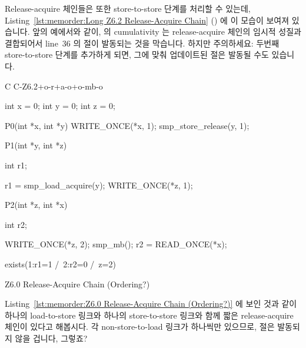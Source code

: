 Release-acquire 체인들은 또한 store-to-store 단계를 처리할 수 있는데,
Listing~\ref{lst:memorder:Long Z6.2 Release-Acquire Chain}
()
에 이 모습이 보여져 있습니다.
앞의 예에서와 같이,  의 cumulativity 는 release-acquire
체인의 임시적 성질과 결합되어서 line~36 의  절이 발동되는 것을
막습니다.
하지만 주의하세요: 두번째 store-to-store 단계를 추가하게 되면, 그에 맞춰
업데이트된  절은 발동될 수도 있습니다.

\begin{listing}[tbp]
{ \scriptsize
\begin{verbbox}[\LstLineNo]
C C-Z6.2+o-r+a-o+o-mb-o

{
int x = 0;
int y = 0;
int z = 0;
}

P0(int *x, int *y)
{
  WRITE_ONCE(*x, 1);
  smp_store_release(y, 1);
}

P1(int *y, int *z)
{
  int r1;

  r1 = smp_load_acquire(y);
  WRITE_ONCE(*z, 1);
}

P2(int *z, int *x)
{
  int r2;

  WRITE_ONCE(*z, 2);
  smp_mb();
  r2 = READ_ONCE(*x);
}

exists(1:r1=1 /\ 2:r2=0 /\ z=2)
\end{verbbox}
}
\centering
\theverbbox
\caption{Z6.0 Release-Acquire Chain (Ordering?)}
\label{lst:memorder:Z6.0 Release-Acquire Chain (Ordering?)}
\end{listing}

\QuickQuiz{}
	Listing~\ref{lst:memorder:Z6.0 Release-Acquire Chain (Ordering?)}
	에 보인 것과 같이 하나의 load-to-store 링크와 하나의 store-to-store
	링크와 함께 짧은 release-acquire 체인이 있다고 해봅시다.
	각 non-store-to-load 링크가 하나씩만 있으므로,  절은
	발동되지 않을 겁니다, 그렇죠?
	\iffalse

